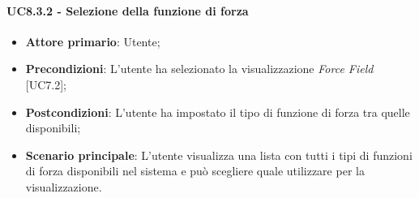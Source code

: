 \paragraph{UC8.3.2 - Selezione della funzione di forza}
\begin{itemize}
	\item \textbf{Attore primario}: Utente;
	\item \textbf{Precondizioni}: L'utente ha selezionato la visualizzazione \textit{Force Field} [UC7.2];
	\item \textbf{Postcondizioni}: L'utente ha impostato il tipo di funzione di forza tra quelle disponibili;
	
	\item \textbf{Scenario principale}: L'utente visualizza una lista con tutti i tipi di funzioni di forza disponibili nel sistema e può scegliere quale utilizzare per la visualizzazione.
\end{itemize}